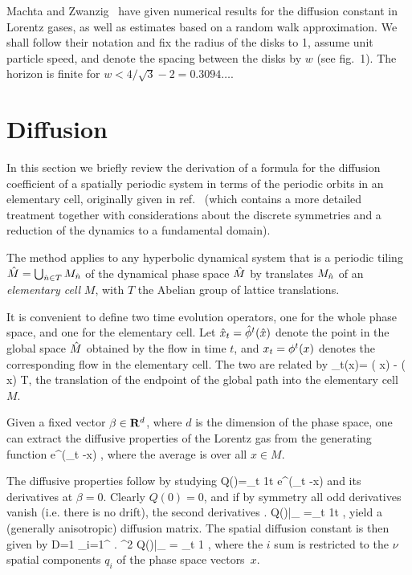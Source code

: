 Machta and Zwanzig~\cite{MZ} have given numerical results
for the diffusion constant in Lorentz gases,  as well as
estimates based on a random walk approximation. We shall follow
their notation and fix the radius of the disks to 1,
assume unit particle speed, and
denote the spacing between the disks by $w$ (see fig.~1).
The horizon is finite for $w < 4/\sqrt{3}-2 = 0.3094\dots$.

\section{Diffusion}
In this section we briefly review the
derivation of a formula for the diffusion coefficient
of a spatially periodic system in terms of the periodic orbits in an elementary
cell, originally given in ref.~\cite{CEG} (which contains
a more detailed treatment together with considerations about the
discrete symmetries and a reduction of the dynamics to a fundamental domain).

The method applies to any  hyperbolic dynamical system that is a periodic
tiling $\hat M=\bigcup_{ \hat n \in T} M_{\hat n}$ of the dynamical phase space $\hat M$
by translates $M_{\hat n}$ of an {\sl elementary cell} $M$, with $T$ the
Abelian group of lattice translations.

It is convenient to define two time evolution operators, one
for the whole phase space, and one for the elementary cell.
Let $\hat x_t=\hat{\phi}^t ( \hat x)$ denote the point in
the global space $\hat M$ obtained by the flow in time $t$,
and $x_t=\phi^t ( x)$ denotes the corresponding flow in
the elementary cell. The two are related by
\be \hn_t(x)= \hflow ( x) - \flow ( x) \in T\;,\label{hatn} \ee
the translation of the endpoint of the global path into the elementary cell $M$.

Given a fixed vector $\beta \in {\bf R}^d$, where $d$ is the dimension of the
phase space, one can extract the diffusive properties of the Lorentz gas from
the generating function
\be \langle e^{\beta \cdot (\hx_t -x) } \rangle\;,\label{generate} \ee
where the average is over all $x \in M$.

The diffusive properties follow by studying
\be Q(\beta)=\lim_{t\rightarrow \infty} {1\over t} \log
    \langle e^{\beta \cdot (\hx_t -x) } \rangle \label{Q} \ee
and its derivatives at $\beta=0$. Clearly $Q(0)=0$, and if by symmetry all odd
derivatives vanish (i.e. there is no drift), the second derivatives
\be \left . {{\partial} }
    {{\partial} }
    Q(\beta)\right |_{} =\lim_{t\rightarrow \infty} {1\over t}
     \rangle\;, \ee
yield a (generally anisotropic) diffusion matrix.
The spatial diffusion constant is then given by
\be D={1\over {2 \nu}} \sum_{i=1}^{\nu} \left .
    {{\partial}^2 }
   Q(\beta)\right |_{} = \lim_{t\rightarrow \infty} {1}
    \rangle\;, \label{diffus}\ee
where the $i$ sum is restricted to the $\nu$ spatial components $q_i$ of
the phase space vectors~$x$.

